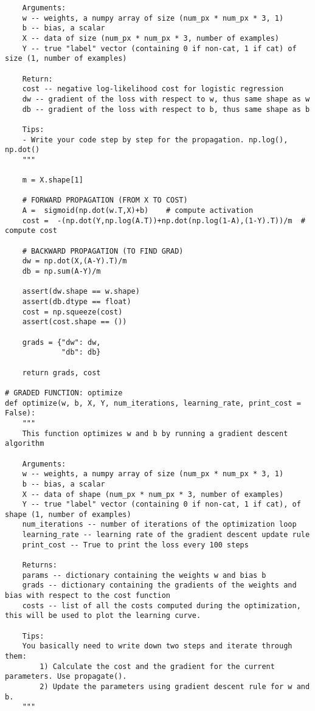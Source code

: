 \begin{verbatim}
    Arguments:
    w -- weights, a numpy array of size (num_px * num_px * 3, 1)
    b -- bias, a scalar
    X -- data of size (num_px * num_px * 3, number of examples)
    Y -- true "label" vector (containing 0 if non-cat, 1 if cat) of size (1, number of examples)

    Return:
    cost -- negative log-likelihood cost for logistic regression
    dw -- gradient of the loss with respect to w, thus same shape as w
    db -- gradient of the loss with respect to b, thus same shape as b
    
    Tips:
    - Write your code step by step for the propagation. np.log(), np.dot()
    """
    
    m = X.shape[1]
    
    # FORWARD PROPAGATION (FROM X TO COST)
    A =  sigmoid(np.dot(w.T,X)+b)    # compute activation
    cost =  -(np.dot(Y,np.log(A.T))+np.dot(np.log(1-A),(1-Y).T))/m  # compute cost
    
    # BACKWARD PROPAGATION (TO FIND GRAD)
    dw = np.dot(X,(A-Y).T)/m
    db = np.sum(A-Y)/m

    assert(dw.shape == w.shape)
    assert(db.dtype == float)
    cost = np.squeeze(cost)
    assert(cost.shape == ())
    
    grads = {"dw": dw,
             "db": db}
    
    return grads, cost

# GRADED FUNCTION: optimize
def optimize(w, b, X, Y, num_iterations, learning_rate, print_cost = False):
    """
    This function optimizes w and b by running a gradient descent algorithm
    
    Arguments:
    w -- weights, a numpy array of size (num_px * num_px * 3, 1)
    b -- bias, a scalar
    X -- data of shape (num_px * num_px * 3, number of examples)
    Y -- true "label" vector (containing 0 if non-cat, 1 if cat), of shape (1, number of examples)
    num_iterations -- number of iterations of the optimization loop
    learning_rate -- learning rate of the gradient descent update rule
    print_cost -- True to print the loss every 100 steps
    
    Returns:
    params -- dictionary containing the weights w and bias b
    grads -- dictionary containing the gradients of the weights and bias with respect to the cost function
    costs -- list of all the costs computed during the optimization, this will be used to plot the learning curve.
    
    Tips:
    You basically need to write down two steps and iterate through them:
        1) Calculate the cost and the gradient for the current parameters. Use propagate().
        2) Update the parameters using gradient descent rule for w and b.
    """
    

\end{verbatim}
